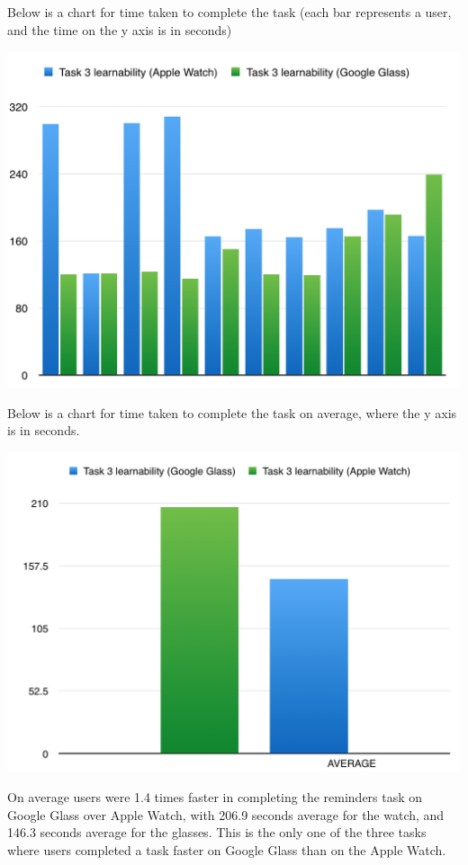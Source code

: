 \documentclass[paper=a4, fontsize=11pt]{scrartcl}	%
\numberwithin{equation}{section}															%
\numberwithin{figure}{section}																%
\numberwithin{table}{section}																%
\begin{document}
Below is a chart for time taken to complete the task (each bar represents a user, and the time on the y axis is in seconds)

\includegraphics[scale=0.8]{task3learnability}


Below is a chart for time taken to complete the task on average, where the y axis is in seconds.

\includegraphics[scale=0.6]{task3learnav}

On average users were 1.4 times faster in completing the reminders task on Google Glass over Apple Watch, with 206.9 seconds average for the watch, and 146.3 seconds average for the glasses. This is the only one of the three tasks where users completed a task faster on Google Glass than on the Apple Watch.
\end{document}
